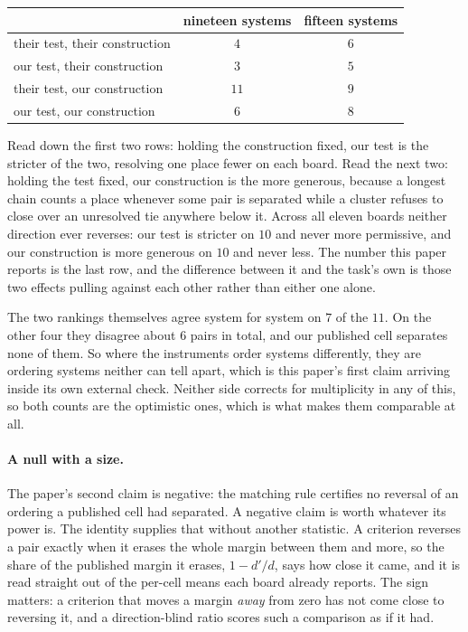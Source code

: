 \begin{center}
\footnotesize
\begin{tabular}{lcc}
\toprule
 & nineteen systems & fifteen systems \\
\midrule
their test, their construction   & $4$  & $6$ \\
our test, their construction     & $3$  & $5$ \\
their test, our construction     & $11$ & $9$ \\
our test, our construction       & $6$  & $8$ \\
\bottomrule
\end{tabular}
\end{center}

Read down the first two rows: holding the construction fixed, our test is the stricter of the two,
resolving one place fewer on each board. Read the next two: holding the test fixed, our construction
is the more generous, because a longest chain counts a place whenever some pair is separated while
a cluster refuses to close over an unresolved tie anywhere below it. Across all eleven boards
neither direction ever reverses: our test is stricter on $10$ and never more permissive, and our
construction is more generous on $10$ and never less. The number this paper reports is the last row,
and the difference between it and the task's own is those two effects pulling against each other
rather than either one alone.

The two rankings themselves agree system for system on $7$ of the $11$. On the other four they
disagree about $6$ pairs in total, and our published cell separates none of them. So where the instruments order systems differently, they are ordering systems neither can tell apart, which is
this paper's first claim arriving inside its own external check. Neither side corrects for
multiplicity in any of this, so both counts are the optimistic ones, which is what makes them
comparable at all.

\paragraph{A null with a size.} The paper's second claim is negative: the matching rule certifies no reversal of an ordering a published cell had separated. A negative claim is
worth whatever its power is. The identity supplies that without another statistic. A criterion
reverses a pair exactly when it erases the whole margin between them and more, so the share of the
published margin it erases, $1 - d'/d$, says how close it came, and it is read straight out of the
per-cell means each board already reports. The sign matters: a criterion that moves a margin
\emph{away} from zero has not come close to reversing it, and a direction-blind ratio scores such a
comparison as if it had.

